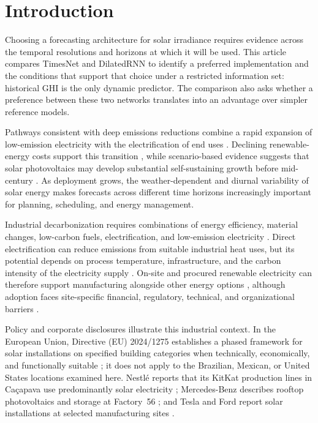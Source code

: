 \section{Introduction}
\label{sec:introduction}

Choosing a forecasting architecture for solar irradiance requires evidence
across the temporal resolutions and horizons at which it will be used.
This article compares TimesNet and DilatedRNN to identify a preferred
implementation and the conditions that support that choice under a
restricted information set: historical GHI is the only dynamic predictor.
The comparison also asks whether a preference between these two networks
translates into an advantage over simpler reference models.

Pathways consistent with deep emissions reductions combine a rapid expansion
of low-emission electricity with the electrification of end uses
\cite{ipcc2022energy,irena2024weto}. Declining renewable-energy costs support
this transition \cite{luderer2022}, while scenario-based evidence suggests
that solar photovoltaics may develop substantial self-sustaining growth
before mid-century \cite{nijsse2023}. As deployment grows, the
weather-dependent and diurnal variability of solar energy makes forecasts
across different time horizons increasingly important for planning,
scheduling, and energy management.

Industrial decarbonization requires combinations of energy efficiency,
material changes, low-carbon fuels, electrification, and low-emission
electricity \cite{ipcc2022industry,rissman2020}. Direct electrification can
reduce emissions from suitable industrial heat uses, but its potential
depends on process temperature, infrastructure, and the carbon intensity of
the electricity supply \cite{madeddu2020}. On-site and procured renewable
electricity can therefore support manufacturing alongside other energy
options \cite{irena2014manufacturing,padmanathan2018}, although adoption
faces site-specific financial, regulatory, technical, and organizational
barriers \cite{dhingra2023}.

Policy and corporate disclosures illustrate this industrial context. In the
European Union, Directive (EU) 2024/1275 establishes a phased framework for
solar installations on specified building categories when technically,
economically, and functionally suitable \cite{eu2024epbd}; it does not apply
to the Brazilian, Mexican, or United States locations examined here.
Nestl\'e reports that its KitKat production lines in Ca\c{c}apava use
predominantly solar electricity \cite{nestle2024biometano}; Mercedes-Benz
describes rooftop photovoltaics and storage at Factory~56
\cite{mercedesfactory56}; and Tesla and Ford report solar installations at
selected manufacturing sites \cite{tesla2021impact,ford2023valencia}.

